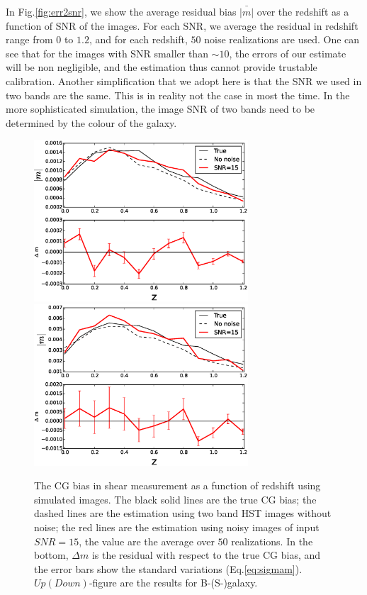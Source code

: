 \documentclass[useAMS,usenatbib]{mn2e}
\begin{document}
In Fig.\ref{fig:err2snr}, we show the average residual bias
$\bar{|m|}$ over the redshift as a function of SNR of the images. For
each SNR, we average the residual in redshift range from $0$ to $1.2$,
and for each redshift, $50$ noise realizations are used. One can see
that for the images with SNR smaller than $\sim10$, the errors of our
estimate will be non negligible, and the estimation thus cannot
provide trustable calibration. Another simplification that we adopt
here is that the SNR we used in two bands are the same. This is in
reality not the case in most the time. In the more sophisticated
simulation, the image SNR of two bands need to be determined by the
colour of the galaxy.



\begin{figure}
  \includegraphics[width=8.0cm]{zs2n_b_snr15.eps}
  \includegraphics[width=8.0cm]{zs2n_s_snr15.eps}
\caption{The CG bias in shear measurement as a function of redshift
  using simulated images. The black solid lines are the true CG bias;
  the dashed lines are the estimation using two band HST images
  without noise; the red lines are the estimation using noisy images
  of input $SNR=15$, the value are the average over $50$
  realizations. In the bottom, $\Delta m$ is the residual with respect
  to the true CG bias, and the error bars show the standard variations
  (Eq.\ref{eq:sigmam}). $Up(Down)$-figure are the results for
  B-(S-)galaxy.}
\label{fig:biasofz15}
\end{figure}
\end{document}
